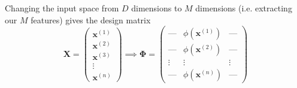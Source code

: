 \documentclass{article}
\theoremstyle{definition}
\begin{document}
    Changing the input space from $D$ dimensions to $M$ dimensions (i.e. extracting our $M$ features) gives the design matrix 
    \[\mathbf{X} = \begin{pmatrix} \mathbf{x}^{(1)} \\ \mathbf{x}^{(2)} \\ \mathbf{x}^{(3)} \\ \vdots \\ \mathbf{x}^{(n)} \end{pmatrix} \implies \boldsymbol{\Phi} = \begin{pmatrix}
    \text{---} & \phi(\mathbf{x}^{(1)}) & \text{---} \\
    \text{---} & \phi(\mathbf{x}^{(2)}) & \text{---} \\
    \vdots & \vdots & \vdots \\
    \text{---} & \phi(\mathbf{x}^{(n)}) & \text{---}
    \end{pmatrix}\]
\end{document}
